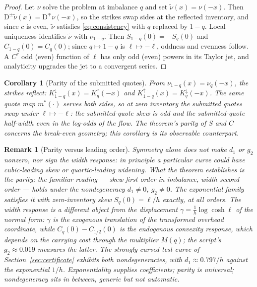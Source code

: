 \documentclass[11pt]{article}
\newtheorem{corollary}{Corollary}
\newtheorem{remark}{Remark}
\begin{document}
\begin{proof}
Let $\nu$ solve the problem at imbalance $q$ and set $\tilde\nu(x) = \nu(-x)$. Then $\mathrm{D}^{\pm}\tilde\nu(x) = \mathrm{D}^{\mp}\nu(-x)$, so the strikes swap sides at the reflected inventory, and since $c$ is even, $\tilde\nu$ satisfies \eqref{eq:consistency} with $q$ replaced by $1-q$. Local uniqueness identifies $\tilde\nu$ with $\nu_{1-q}$. Then $S_{1-q}(0) = -S_q(0)$ and $C_{1-q}(0) = C_q(0)$; since $q \mapsto 1-q$ is $\ell \mapsto -\ell$, oddness and evenness follow. A $C^r$ odd (even) function of $\ell$ has only odd (even) powers in its Taylor jet, and analyticity upgrades the jet to a convergent series.
\end{proof}

\begin{corollary}[Parity of the submitted quotes]\label{cor:quoteparity}
From $\nu_{1-q}(x) = \nu_q(-x)$, the strikes reflect: $K^{\downarrow}_{1-q}(x) = K^{\uparrow}_q(-x)$ and $K^{\uparrow}_{1-q}(x) = K^{\downarrow}_q(-x)$. The same quote map $m^\ast(\cdot)$ serves both sides, so at zero inventory the submitted quotes swap under $\ell \mapsto -\ell$: the submitted-quote skew is odd and the submitted-quote half-width even in the log-odds of the flow. The theorem's parity of $S$ and $C$ concerns the break-even geometry; this corollary is its observable counterpart.
\end{corollary}

\begin{remark}[Parity versus leading order]
Symmetry alone does not make $d_1$ or $g_2$ nonzero, nor sign the width response: in principle a particular curve could have cubic-leading skew or quartic-leading widening. What the theorem establishes is the parity; the familiar reading --- skew first order in imbalance, width second order --- holds under the nondegeneracy $d_1 \neq 0$, $g_2 \neq 0$. The exponential family satisfies it with zero-inventory skew $S_q(0) = \ell/h$ exactly, at all orders. The width response is a different object from the displacement $\gamma = \tfrac1h \log\cosh\ell$ of the normal form: $\gamma$ is the exogenous translation of the transformed overhead coordinate, while $C_q(0) - C_{1/2}(0)$ is the endogenous convexity response, which depends on the carrying cost through the multiplier $M(q)$; the script's $g_2 \approx 0.019$ measures the latter. The strongly curved test curve of Section~\ref{sec:certificate} exhibits both nondegeneracies, with $d_1 \approx 0.797/h$ against the exponential $1/h$. Exponentiality supplies coefficients; parity is universal; nondegeneracy sits in between, generic but not automatic.
\end{remark}
\end{document}
